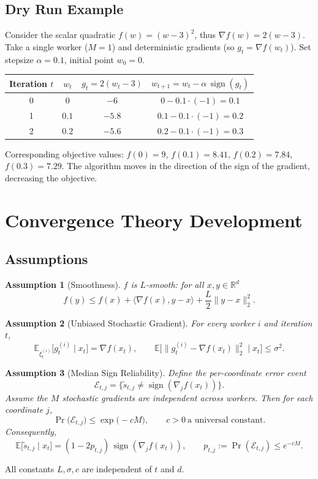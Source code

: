 \documentclass{article}
\newtheorem{assumption}{Assumption}
\newcommand{\sign}{\operatorname{sign}}
\newcommand{\E}{\mathbb{E}}
\newcommand{\R}{\mathbb{R}}
\begin{document}
\subsection*{Dry Run Example}
Consider the scalar quadratic $f(w)=(w-3)^{2}$, thus $\nabla f(w)=2(w-3)$.
Take a single worker ($M=1$) and deterministic gradients (so $g_{t}= \nabla f(w_{t})$).  
Set stepsize $\alpha=0.1$, initial point $w_{0}=0$.

\begin{center}
\begin{tabular}{c|c|c|c}
Iteration $t$ & $w_{t}$ & $g_{t}=2(w_{t}-3)$ & $w_{t+1}=w_{t}-\alpha\,\sign(g_{t})$\\ \hline
0 & $0$ & $-6$ & $0-0.1\cdot(-1)=0.1$\\
1 & $0.1$ & $-5.8$ & $0.1-0.1\cdot(-1)=0.2$\\
2 & $0.2$ & $-5.6$ & $0.2-0.1\cdot(-1)=0.3$\\
\end{tabular}
\end{center}
Corresponding objective values: $f(0)=9$, $f(0.1)=8.41$, $f(0.2)=7.84$, $f(0.3)=7.29$.
The algorithm moves in the direction of the sign of the gradient, decreasing the objective.

\section*{Convergence Theory Development}
\subsection*{Assumptions}
\begin{assumption}[Smoothness]\label{ass:smooth}
$f$ is $L$‑smooth: for all $x,y\in\R^{d}$
\[
f(y)\le f(x)+\langle\nabla f(x),y-x\rangle+\frac{L}{2}\|y-x\|_{2}^{2}.
\]
\end{assumption}
\begin{assumption}[Unbiased Stochastic Gradient]\label{ass:unbiased}
For every worker $i$ and iteration $t$,
\[
\E_{\xi^{(i)}_{t}}\big[g^{(i)}_{t}\mid x_{t}\big]=\nabla f(x_{t}),\qquad
\E\big[\|g^{(i)}_{t}-\nabla f(x_{t})\|_{2}^{2}\mid x_{t}\big]\le\sigma^{2}.
\]
\end{assumption}
\begin{assumption}[Median Sign Reliability]\label{ass:median}
Define the per‑coordinate error event 
\[
\mathcal{E}_{t,j}=\big\{\tilde{s}_{t,j}\neq\sign(\nabla_{j}f(x_{t}))\big\}.
\]
Assume the $M$ stochastic gradients are independent across workers.  
Then for each coordinate $j$,
\[
\Pr\big(\mathcal{E}_{t,j}\big)\le \exp\!\big(-cM\big),\qquad 
c>0\ \text{a universal constant}.
\tag{A3}
\]
Consequently,
\[
\E\big[\tilde{s}_{t,j}\mid x_{t}\big]
    =(1-2p_{t,j})\,\sign(\nabla_{j}f(x_{t})),\qquad 
    p_{t,j}:=\Pr(\mathcal{E}_{t,j})\le e^{-cM}.
\tag{A3$'$}
\]
\end{assumption}
All constants $L,\sigma,c$ are independent of $t$ and $d$.
\end{document}
